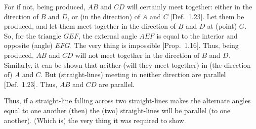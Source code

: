 \begin{Parallel}{}{}
{For if not, being produced, $AB$ and $CD$ will certainly meet together:
either in the direction of $B$ and $D$, or (in the
direction) of $A$ and $C$ [Def.~1.23]. Let them be
produced, and let them meet together in the direction of $B$ and $D$ at
 (point) $G$. So, for the triangle $GEF$, the external angle
$AEF$ is equal to the interior and opposite (angle) $EFG$. The
very thing is impossible [Prop.~1.16]. Thus, being produced, $AB$ and $CD$
will not meet together in the direction of $B$ and $D$. Similarly, 
it can be shown that neither (will they meet together) in (the
direction of) $A$ and $C$. But  (straight-lines) meeting in neither
direction are parallel [Def.~1.23]. Thus, $AB$ and $CD$ are parallel.

Thus, if a straight-line falling across two straight-lines makes  the alternate
angles equal to one another (then) the (two) straight-lines will be parallel (to
one another). (Which is) the very thing it was required to show.}
\end{Parallel}

